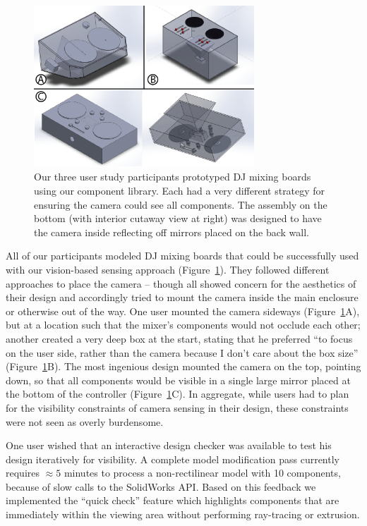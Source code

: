     \begin{figure}
\centering
\includegraphics[width=3.25in]{figures/sauron/study.png}
\caption{Our three user study participants prototyped DJ mixing boards using our component library. Each had a very different strategy for ensuring the camera could see all components. The assembly on the bottom (with interior cutaway view at right) was designed to have the camera inside reflecting off mirrors placed on the back wall.}
\label{fig:sauron-study}
\end{figure}

    All of our participants modeled DJ mixing boards that could be successfully used with our vision-based sensing approach (Figure~\ref{fig:sauron-study}). They followed different approaches to place the camera -- though all showed concern for the aesthetics of their design and accordingly tried to mount the camera inside the main enclosure or otherwise out of the way. One user mounted the camera sideways (Figure~\ref{fig:sauron-study}A), but at a location such that the mixer's components would not occlude each other; another created a very deep box at the start, stating that he preferred ``to focus on the user side, rather than the camera because I don't care about the box size'' (Figure~\ref{fig:sauron-study}B). The most ingenious design mounted the camera on the top, pointing down, so that all components would be visible in a single large mirror placed at the bottom of the controller (Figure~\ref{fig:sauron-study}C). In aggregate, while users had to plan for the visibility constraints of camera sensing in their design, these constraints were not seen as overly burdensome.

    One user wished that an interactive design checker was available to test his design iteratively for visibility. A complete model modification pass currently requires $\approx 5$ minutes to process a non-rectilinear model with 10 components, because of slow calls to the SolidWorks API. Based on this feedback we implemented the ``quick check'' feature which highlights components that are immediately within the viewing area without performing ray-tracing or extrusion.

